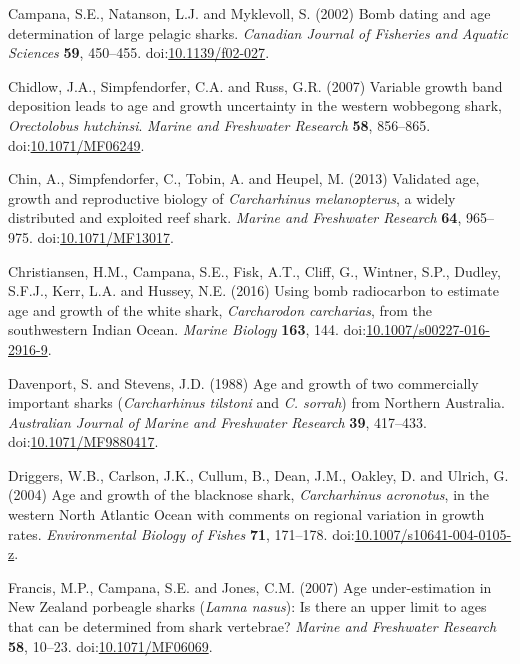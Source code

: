 \documentclass[]{article}
\begin{document}
\hypertarget{ref-campana_bomb_2002}{}
Campana, S.E., Natanson, L.J. and Myklevoll, S. (2002) Bomb dating and
age determination of large pelagic sharks. \emph{Canadian Journal of
Fisheries and Aquatic Sciences} \textbf{59}, 450--455.
doi:\href{https://doi.org/10.1139/f02-027}{10.1139/f02-027}.

\hypertarget{ref-chidlow_variable_2007}{}
Chidlow, J.A., Simpfendorfer, C.A. and Russ, G.R. (2007) Variable growth
band deposition leads to age and growth uncertainty in the western
wobbegong shark, \emph{Orectolobus hutchinsi}. \emph{Marine and
Freshwater Research} \textbf{58}, 856--865.
doi:\href{https://doi.org/10.1071/MF06249}{10.1071/MF06249}.

\hypertarget{ref-chin_validated_2013}{}
Chin, A., Simpfendorfer, C., Tobin, A. and Heupel, M. (2013) Validated
age, growth and reproductive biology of \emph{Carcharhinus
melanopterus}, a widely distributed and exploited reef shark.
\emph{Marine and Freshwater Research} \textbf{64}, 965--975.
doi:\href{https://doi.org/10.1071/MF13017}{10.1071/MF13017}.

\hypertarget{ref-christiansen_using_2016}{}
Christiansen, H.M., Campana, S.E., Fisk, A.T., Cliff, G., Wintner, S.P.,
Dudley, S.F.J., Kerr, L.A. and Hussey, N.E. (2016) Using bomb
radiocarbon to estimate age and growth of the white shark,
\emph{Carcharodon carcharias}, from the southwestern Indian Ocean.
\emph{Marine Biology} \textbf{163}, 144.
doi:\href{https://doi.org/10.1007/s00227-016-2916-9}{10.1007/s00227-016-2916-9}.

\hypertarget{ref-davenport_age_1988}{}
Davenport, S. and Stevens, J.D. (1988) Age and growth of two
commercially important sharks (\emph{Carcharhinus tilstoni} and \emph{C.
sorrah}) from Northern Australia. \emph{Australian Journal of Marine and
Freshwater Research} \textbf{39}, 417--433.
doi:\href{https://doi.org/10.1071/MF9880417}{10.1071/MF9880417}.

\hypertarget{ref-driggers_age_2004}{}
Driggers, W.B., Carlson, J.K., Cullum, B., Dean, J.M., Oakley, D. and
Ulrich, G. (2004) Age and growth of the blacknose shark,
\emph{Carcharhinus acronotus}, in the western North Atlantic Ocean with
comments on regional variation in growth rates. \emph{Environmental
Biology of Fishes} \textbf{71}, 171--178.
doi:\href{https://doi.org/10.1007/s10641-004-0105-z}{10.1007/s10641-004-0105-z}.

\hypertarget{ref-francis_age_2007}{}
Francis, M.P., Campana, S.E. and Jones, C.M. (2007) Age under-estimation
in New Zealand porbeagle sharks (\emph{Lamna nasus}): Is there an upper
limit to ages that can be determined from shark vertebrae? \emph{Marine
and Freshwater Research} \textbf{58}, 10--23.
doi:\href{https://doi.org/10.1071/MF06069}{10.1071/MF06069}.
\end{document}
